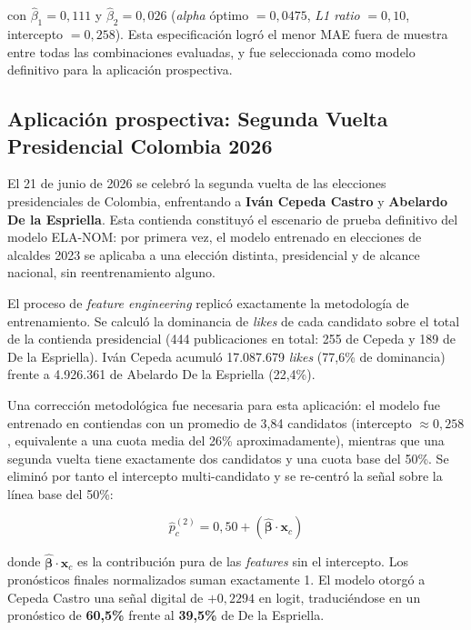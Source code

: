con $\hat{\beta}_1 = 0{,}111$ y $\hat{\beta}_2 = 0{,}026$ (\textit{alpha} óptimo $= 0{,}0475$, \textit{L1 ratio} $= 0{,}10$, intercepto $= 0{,}258$). Esta especificación logró el menor MAE fuera de muestra entre todas las combinaciones evaluadas, y fue seleccionada como modelo definitivo para la aplicación prospectiva.

\subsection{Aplicación prospectiva: Segunda Vuelta Presidencial Colombia 2026}

El 21 de junio de 2026 se celebró la segunda vuelta de las elecciones presidenciales de Colombia, enfrentando a \textbf{Iván Cepeda Castro} y \textbf{Abelardo De la Espriella}. Esta contienda constituyó el escenario de prueba definitivo del modelo ELA-NOM: por primera vez, el modelo entrenado en elecciones de alcaldes 2023 se aplicaba a una elección distinta, presidencial y de alcance nacional, sin reentrenamiento alguno.

El proceso de \textit{feature engineering} replicó exactamente la metodología de entrenamiento. Se calculó la dominancia de \textit{likes} de cada candidato sobre el total de la contienda presidencial (444 publicaciones en total: 255 de Cepeda y 189 de De la Espriella). Iván Cepeda acumuló 17.087.679 \textit{likes} (77{,}6\% de dominancia) frente a 4.926.361 de Abelardo De la Espriella (22{,}4\%).

Una corrección metodológica fue necesaria para esta aplicación: el modelo fue entrenado en contiendas con un promedio de 3{,}84 candidatos (intercepto $\approx 0{,}258$, equivalente a una cuota media del 26\% aproximadamente), mientras que una segunda vuelta tiene exactamente dos candidatos y una cuota base del 50\%. Se eliminó por tanto el intercepto multi-candidato y se re-centró la señal sobre la línea base del 50\%:

\begin{equation}
    \hat{p}_c^{(2)} = 0{,}50 + (\hat{\boldsymbol{\beta}} \cdot \mathbf{x}_c)
    \label{eq:recentrado}
\end{equation}

donde $\hat{\boldsymbol{\beta}} \cdot \mathbf{x}_c$ es la contribución pura de las \textit{features} sin el intercepto. Los pronósticos finales normalizados suman exactamente 1. El modelo otorgó a Cepeda Castro una señal digital de $+0{,}2294$ en logit, traduciéndose en un pronóstico de \textbf{60{,}5\%} frente al \textbf{39{,}5\%} de De la Espriella.

